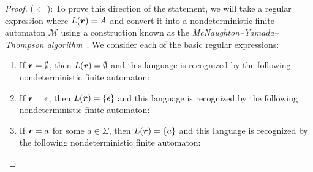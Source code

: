 \begin{theorem}
\begin{proof}
($\Leftarrow$): To prove this direction of the statement, we will take a regular expression  where $L(\bm r) = A$ and convert it into a nondeterministic finite automaton $\mathcal{M}$ using a construction known as the \emph{McNaughton--Yamada--Thompson algorithm}~\citep{McNaughtonYamada1960RegularExpressionsAutomata, Thompson1968RegularExpressionSearch}. We consider each of the basic regular expressions:
\begin{enumerate}
\item If $\bm r = \emptyset$, then $L(\bm r) = \emptyset$ and this language is recognized by the following nondeterministic finite automaton:
\begin{center}
\end{center}

\item If $\bm r = \epsilon$, then $L(\bm r) = \{\epsilon\}$ and this language is recognized by the following nondeterministic finite automaton:
\begin{center}
\end{center}

\item If $\bm r = a$ for some $a \in \Sigma$, then $L(\bm r) = \{a\}$ and this language is recognized by the following nondeterministic finite automaton:
\begin{center}
\end{center}


\end{enumerate}
\end{proof}
\end{theorem}
